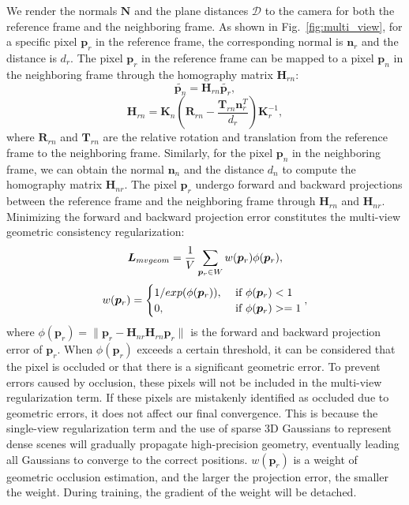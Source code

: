 \documentclass[lettersize,journal]{IEEEtran}
\begin{document}
We render the normals $ \bm{N} $ and the plane distances $ \bm{\mathcal{D}}$ to the camera for both the reference frame and the neighboring frame. As shown in Fig.~\ref{fig:multi_view}, for a specific pixel $ \bm{p}_r $ in the reference frame, the corresponding normal is $ \bm{n}_r $ and the distance is $ d_r $. The pixel $ \bm{p}_r $ in the reference frame can be mapped to a pixel $ \bm{p}_n $ in the neighboring frame through the homography matrix $\bm{H}_{rn}$:
\begin{equation}
\tilde{\bm{p}_n}=\bm{H}_{rn}\tilde{\bm{p}_r},
\end{equation}
\begin{equation}
\bm{H}_{rn}=\bm{K}_n(\bm{R}_{rn}-\frac{\bm{T}_{rn}\bm{n}_r^T}{d_r})\bm{K}_r^{-1},
\end{equation}
where $\bm{R}_{rn}$ and $\bm{T}_{rn}$ are the relative rotation and translation from the reference frame to the neighboring frame. Similarly, for the pixel $ \bm{p}_n $ in the neighboring frame, we can obtain the normal $ \bm{n}_n $ and the distance $ d_n $ to compute the homography matrix $ \bm{H}_{nr} $. The pixel $ \bm{p}_r $ undergo forward and backward projections between the reference frame and the neighboring frame through $ \bm{H}_{rn} $ and $ \bm{H}_{nr} $. Minimizing the forward and backward projection error constitutes the multi-view geometric consistency regularization:
\begin{equation}\color{r}
    \bm{L}_{mvgeom}=\frac{1}{V}\sum_{\bm{p}_r\in W}w(\bm{p}_r)\phi(\bm{p}_r),
\end{equation}
\begin{equation}\color{r}
   w(\bm{p}_r)=\begin{cases}1/exp(\phi(\bm{p}_r)),
 & \text{ if } \phi(\bm{p}_r) < 1
 \\0,
  & \text{ if } \phi(\bm{p}_r) >= 1
\end{cases},
\end{equation}
where 
$
    \phi(\bm{p}_r)=\parallel \bm{p}_r-\bm{H}_{nr}\bm{H}_{rn}\bm{p}_r \parallel
$ is the forward and backward projection error of $\bm{p}_r$. When $\phi(\bm{p}_r)$ exceeds a certain threshold, it can be considered that the pixel is occluded or that there is a significant geometric error. To prevent errors caused by occlusion, these pixels will not be included in the multi-view regularization term. If these pixels are mistakenly identified as occluded due to geometric errors, it does not affect our final convergence. This is because the single-view regularization term and the use of sparse 3D Gaussians to represent dense scenes will gradually propagate high-precision geometry, eventually leading all Gaussians to converge to the correct positions. \textcolor{r}{$w(\bm{p}_r)$ is a weight of geometric occlusion estimation, and the larger the projection error, the smaller the weight. During training, the gradient of the weight will be detached.}
\end{document}
